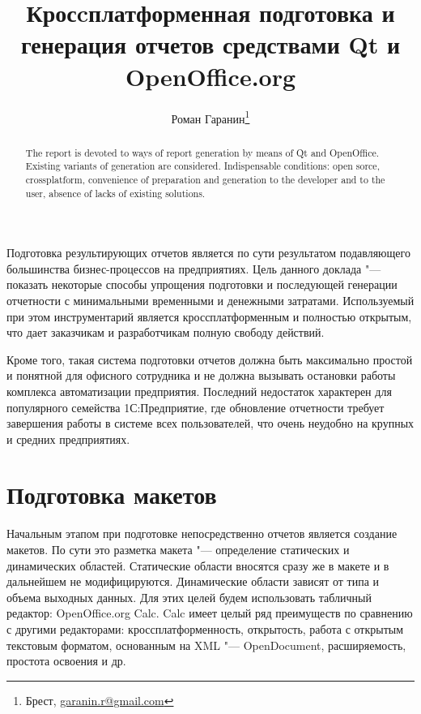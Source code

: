 \documentclass[10pt, a5paper]{article}
\begin{document}
\title{Кросcплатформенная подготовка и генерация отчетов средствами Qt и OpenOffice.org}
\author{Роман Гаранин\footnote{Брест, \url{garanin.r@gmail.com}}}
\maketitle

\begin{abstract}
The report is devoted to ways of report generation by means of Qt and OpenOffice. Existing
variants of generation are con\-si\-dered. Indispensable conditions: open
sorce, crossplatform,
con\-ve\-nience of preparation and generation to the developer and to the
user, absence of lacks of existing solutions.


\end{abstract}

Подготовка результирующих отчетов является по сути результатом подавляющего большинства бизнес-процессов на предприятиях. Цель данного доклада "--- показать некоторые способы упрощения подготовки и последующей генерации отчетности с минимальными временными и денежными затратами. Используемый при этом инструментарий является кроссплатформенным и полностью открытым, что дает заказчикам и разработчикам полную свободу действий.

Кроме того, такая система подготовки отчетов должна быть максимально простой и понятной для офисного сотрудника и не должна вызывать остановки работы комплекса автоматизации предприятия. Последний недостаток характерен для популярного семейства 1С:Предприятие, где обновление отчетности требует завершения работы в системе всех пользователей, что очень неудобно на крупных и средних предприятиях.

\section*{Подготовка макетов}
Начальным этапом при подготовке непосредственно отчетов является создание макетов. По сути это разметка макета "--- определение статических и динамических областей. Статические области вносятся сразу же в макете и в дальнейшем не модифицируются. Динамические области зависят от типа и объема выходных данных. Для этих целей будем использовать табличный редактор: OpenOffice.org Calc. Calc имеет целый ряд преимуществ по сравнению с другими редакторами: кроссплатформенность, открытость, работа с открытым текстовым форматом, основанным на XML "--- OpenDocument, расширяемость, простота освоения и др.
\end{document}
